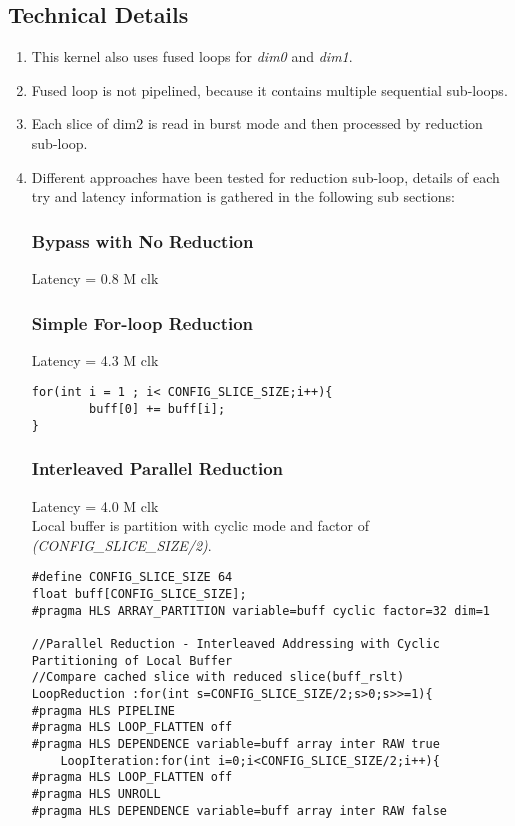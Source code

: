 \documentclass[•]{article}
\begin{document}
\subsection{Technical Details}
\begin{enumerate}
\item This kernel also uses fused loops for \emph{dim0} and \emph{dim1}.

\item Fused loop is not pipelined, because it contains multiple sequential sub-loops.

\item Each slice of dim2 is read in burst mode and then processed by reduction sub-loop.

\item Different approaches have been tested for reduction sub-loop, details of each try and latency information is gathered in the following sub sections:

\subsubsection{Bypass with No Reduction}
Latency = 0.8 M clk

\subsubsection{Simple For-loop Reduction}
Latency = 4.3 M clk
\begin{lstlisting}
for(int i = 1 ; i< CONFIG_SLICE_SIZE;i++){
    	buff[0] += buff[i];
}
\end{lstlisting}

\subsubsection{Interleaved Parallel Reduction}
Latency = 4.0 M clk \\
Local buffer is partition with cyclic mode and factor of \emph{(CONFIG\_SLICE\_SIZE/2)}.

\begin{lstlisting}
#define CONFIG_SLICE_SIZE 64
float buff[CONFIG_SLICE_SIZE];
#pragma HLS ARRAY_PARTITION variable=buff cyclic factor=32 dim=1

//Parallel Reduction - Interleaved Addressing with Cyclic Partitioning of Local Buffer
//Compare cached slice with reduced slice(buff_rslt)
LoopReduction :for(int s=CONFIG_SLICE_SIZE/2;s>0;s>>=1){
#pragma HLS PIPELINE
#pragma HLS LOOP_FLATTEN off
#pragma HLS DEPENDENCE variable=buff array inter RAW true
	LoopIteration:for(int i=0;i<CONFIG_SLICE_SIZE/2;i++){
#pragma HLS LOOP_FLATTEN off
#pragma HLS UNROLL
#pragma HLS DEPENDENCE variable=buff array inter RAW false


\end{lstlisting}
\end{enumerate}
\end{document}

